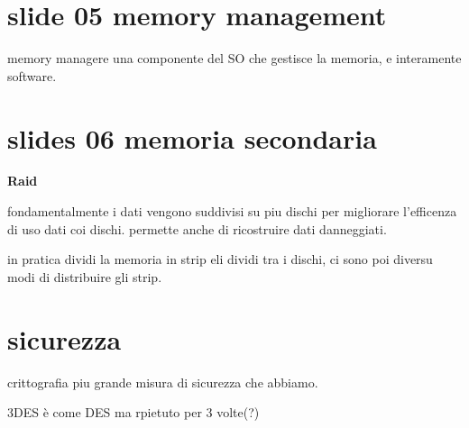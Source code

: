\documentclass[12pt]{article}
\begin{document}
 \section{slide 05 memory management}

 memory managere  una componente del SO che gestisce la memoria, e interamente software.


\section{slides 06 memoria secondaria}

\textbf{Raid}

fondamentalmente i dati vengono suddivisi su piu dischi per migliorare l'efficenza di uso dati coi dischi.
permette anche di ricostruire dati danneggiati.

in pratica dividi la memoria in strip  eli dividi tra i dischi, ci sono poi diversu modi di distribuire gli strip.


\section{sicurezza}

crittografia piu grande misura di sicurezza che abbiamo.

3DES è come DES ma rpietuto per 3 volte(?)
\end{document}
